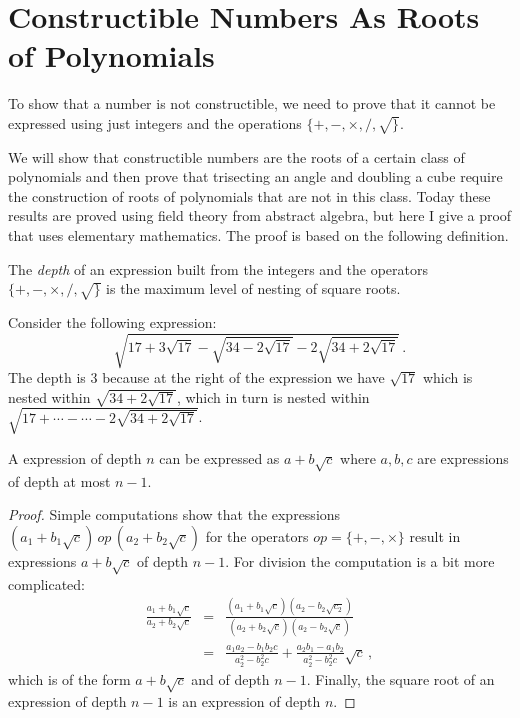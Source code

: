 \newpage

\section{Constructible Numbers As Roots of Polynomials}\label{s.trisect-poly}
To show that a number is not constructible, we need to prove that it cannot be expressed using just integers and the operations $\{+,-,\times,/,\surd\}$.

We will show that constructible numbers are the roots of a certain class of polynomials and then prove that trisecting an angle and doubling a cube require the construction of roots of polynomials that are not in this class. Today these results are proved using field theory from abstract algebra, but here I give a proof that uses elementary mathematics. The proof is based on the following definition.

\begin{definition}
The \emph{depth} of an expression built from the integers and the operators $\{+,-,\times,/,\surd\}$ is the maximum level of nesting of square roots.
\end{definition}

\begin{example}
Consider the following expression:
\[
\sqrt{17+3\sqrt{17} - \sqrt{34-2\sqrt{17}}
  -2\sqrt{34+2\sqrt{17}} }\,.
\]
The depth is $3$ because at the right of the expression we have $\sqrt{17}$ which is nested within $\sqrt{34+2\sqrt{17}}$, which in turn is nested within $\sqrt{17+\cdots-\cdots-2\sqrt{34+2\sqrt{17}}}$.
\end{example}

\begin{theorem}
A expression of depth $n$ can be expressed as $a+b\sqrt{c}$ where $a,b,c$ are expressions of depth at most $n-1$.
\end{theorem}
\begin{proof}
Simple computations show that the expressions $(a_1+b_1\sqrt{c})\,\mathit{op}\,(a_2+b_2\sqrt{c})$ for the operators $\mathit{op}=\{+,-,\times\}$ result in expressions $a+b\sqrt{c}$ of depth $n-1$. For division the computation is a bit more complicated:
\begin{eqnarray*}
\frac{a_1+b_1\sqrt{c}}{a_2+b_2\sqrt{c}}&=&
\frac{(a_1+b_1\sqrt{c})(a_2-b_2\sqrt{c_2})}{(a_2+b_2\sqrt{c})(a_2-b_2\sqrt{c})}\\
&=&\frac{a_1a_2-b_1b_2c}{a_2^2-b_2^2c}+\frac{a_2b_1-a_1b_2}{a_2^2-b_2^2c}\sqrt{c}\,,
\end{eqnarray*}
which is of the form $a+b\sqrt{c}$ and of depth $n-1$.
Finally, the square root of an expression of depth $n-1$ is an expression of depth $n$.
\end{proof}


